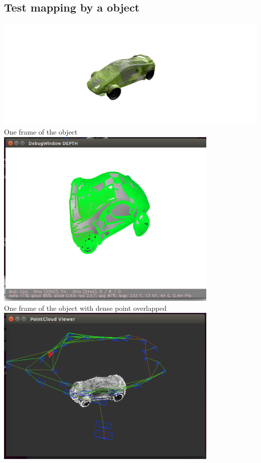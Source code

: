 \documentclass[11pt, oneside]{article}   	%
\begin{document}
\subsection{Test mapping by a object}
\includegraphics[width=1.0\textwidth]{i5}\\
One frame of the object\\
\includegraphics[width=0.8\textwidth]{i9}\\
One frame of the object with dense point overlapped\\
\includegraphics[width=0.8\textwidth]{i6}\\
\end{document}
